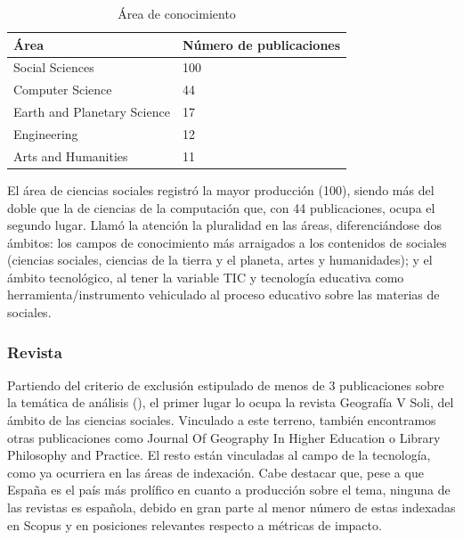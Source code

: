 \documentclass[spanish]{textolivre}
\begin{document}
\begin{table}[h!]
\centering
\begin{threeparttable}
\caption{Área de conocimiento}
\label{tab2}
\begin{tabular}{ll}
\toprule
Área                        & Número de publicaciones \\
\midrule
Social Sciences             & 100                     \\
Computer Science            & 44                      \\
Earth and Planetary Science & 17                      \\
Engineering                 & 12                      \\
Arts and Humanities         & 11                     \\
\bottomrule
\end{tabular}
\end{threeparttable}
\end{table}

El área de ciencias sociales registró la mayor producción (100), siendo más del doble que la de ciencias de la computación que, con 44 publicaciones, ocupa el segundo lugar. Llamó la atención la pluralidad en las áreas, diferenciándose dos ámbitos: los campos de conocimiento más arraigados a los contenidos de sociales (ciencias sociales, ciencias de la tierra y el planeta, artes y humanidades); y el ámbito tecnológico, al tener la variable TIC y tecnología educativa como herramienta/instrumento vehiculado al proceso educativo sobre las materias de sociales.


\subsubsection{Revista}

Partiendo del criterio de exclusión estipulado de menos de 3 publicaciones sobre la temática de análisis (), el primer lugar lo ocupa la revista Geografía V Soli, del ámbito de las ciencias sociales. Vinculado a este terreno, también encontramos otras publicaciones como Journal Of Geography In Higher Education o Library Philosophy and Practice. El resto están vinculadas al campo de la tecnología, como ya ocurriera en las áreas de indexación. Cabe destacar que, pese a que España es el país más prolífico en cuanto a producción sobre el tema, ninguna de las revistas es española, debido en gran parte al menor número de estas indexadas en Scopus y en posiciones relevantes respecto a métricas de impacto.
\end{document}
